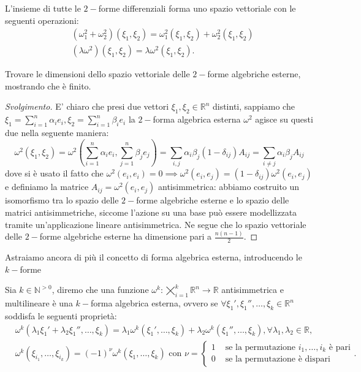 L'insieme di tutte le $2-$forme differenziali forma uno spazio vettoriale con le seguenti operazioni:
\begin{align*}
    &(\omega_1^2 + \omega_2^2)(\xi_1, \xi_2) = \omega_1^2(\xi_1, \xi_2) + \omega_2^2(\xi_1, \xi_2) \\
    &(\lambda \omega^2)(\xi_1, \xi_2) = \lambda \omega^2(\xi_1, \xi_2).
\end{align*}
\begin{exercise}
    Trovare le dimensioni dello spazio vettoriale delle $2-$forme algebriche esterne, mostrando che è finito.
\end{exercise}
\begin{proof}[Svolgimento]
    E' chiaro che presi due vettori $\xi_1, \xi_2 \in \mathbb{R}^n$ distinti, sappiamo che $\xi_1 = \sum\limits_{i=1}^n \alpha_i e_i, \xi_2 = \sum\limits_{i=1}^n \beta_i e_i$ la $2-$forma algebrica esterna $\omega^2$ agisce su questi due nella seguente maniera:
    $$
        \omega^2(\xi_1, \xi_2) = \omega^2(\sum_{i=1}^n \alpha_i e_i, \sum_{j=1}^n \beta_j e_j) = \sum_{i, j} \alpha_i \beta_j (1-\delta_{ij}) A_{ij} = \sum_{i \neq j} \alpha_i \beta_j A_{ij}
    $$
    dove si è usato il fatto che $\omega^2(e_i, e_i) = 0 \implies \omega^2(e_i, e_j) = (1-\delta_{ij}) \omega^2(e_i, e_j)$ e definiamo la matrice $A_{ij} = \omega^2(e_i, e_j)$ antisimmetrica: abbiamo costruito un isomorfismo tra lo spazio delle $2-$forme algebriche esterne e lo spazio delle matrici antisimmetriche, siccome l'azione su una base può essere modellizzata tramite un'applicazione lineare antisimmetrica. Ne segue che lo spazio vettoriale delle $2-$forme algebriche esterne ha dimensione pari a $\frac{n(n-1)}{2}$.
\end{proof}
Astraiamo ancora di più il concetto di forma algebrica esterna, introducendo le $k-$forme
\begin{definition}
    Sia $k \in \mathbb{N}^{> 0}$, diremo che una funzione $\omega^k: \varprod\limits_{i=1}^k \mathbb{R}^n \to \mathbb{R}$ antisimmetrica e multilineare è una $k-$forma algebrica esterna, ovvero se $\forall \xi_1', \xi_1'', \ldots, \xi_k \in \mathbb{R}^n$ soddisfa le seguenti proprietà:
    \begin{align*}
        &\omega^k(\lambda_1 \xi_1' + \lambda_2 \xi_1'', \ldots, \xi_k) = \lambda_1 \omega^k(\xi_1', \ldots, \xi_k) + \lambda_2 \omega^k(\xi_1'', \ldots, \xi_k), \forall \lambda_1, \lambda_2 \in \mathbb{R}, \\
        &\omega^k(\xi_{i_1}, \ldots, \xi_{i_k}) = (-1)^{\nu} \omega^k(\xi_1, \ldots, \xi_k) \text{ con } \nu = \begin{cases} 1 & \text{ se la permutazione } i_1, \ldots, i_k \text{ è pari} \\ 0 & \text{ se la permutazione è dispari } \end{cases}.
    \end{align*}
\end{definition}

